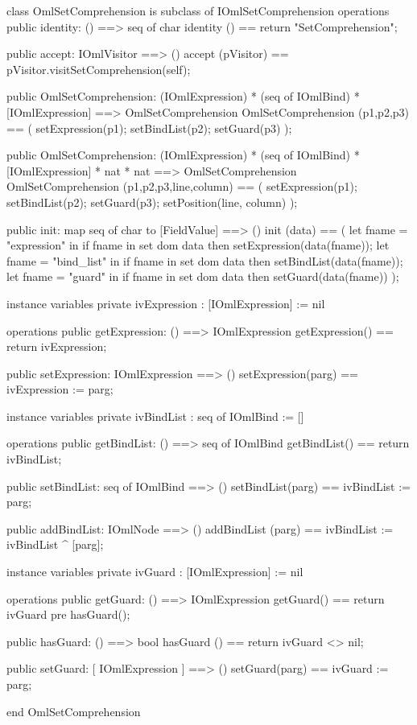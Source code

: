 \begin{vdm_al}
class OmlSetComprehension is subclass of IOmlSetComprehension
operations
  public identity: () ==> seq of char
  identity () == return "SetComprehension";

  public accept: IOmlVisitor ==> ()
  accept (pVisitor) == pVisitor.visitSetComprehension(self);

  public OmlSetComprehension:
    (IOmlExpression) *
    (seq of IOmlBind) *
    [IOmlExpression] ==> OmlSetComprehension
  OmlSetComprehension (p1,p2,p3) == 
    ( setExpression(p1);
      setBindList(p2);
      setGuard(p3) );

  public OmlSetComprehension:
    (IOmlExpression) *
    (seq of IOmlBind) *
    [IOmlExpression] *
    nat *
    nat ==> OmlSetComprehension
  OmlSetComprehension (p1,p2,p3,line,column) == 
    ( setExpression(p1);
      setBindList(p2);
      setGuard(p3);
      setPosition(line, column) );

  public init: map seq of char to [FieldValue] ==> ()
  init (data) ==
    ( let fname = "expression" in
        if fname in set dom data
        then setExpression(data(fname));
      let fname = "bind_list" in
        if fname in set dom data
        then setBindList(data(fname));
      let fname = "guard" in
        if fname in set dom data
        then setGuard(data(fname)) );

instance variables
  private ivExpression : [IOmlExpression] := nil

operations
  public getExpression: () ==> IOmlExpression
  getExpression() == return ivExpression;

  public setExpression: IOmlExpression ==> ()
  setExpression(parg) == ivExpression := parg;

instance variables
  private ivBindList : seq of IOmlBind := []

operations
  public getBindList: () ==> seq of IOmlBind
  getBindList() == return ivBindList;

  public setBindList: seq of IOmlBind ==> ()
  setBindList(parg) == ivBindList := parg;

  public addBindList: IOmlNode ==> ()
  addBindList (parg) == ivBindList := ivBindList ^ [parg];

instance variables
  private ivGuard : [IOmlExpression] := nil

operations
  public getGuard: () ==> IOmlExpression
  getGuard() == return ivGuard
    pre hasGuard();

  public hasGuard: () ==> bool
  hasGuard () == return ivGuard <> nil;

  public setGuard: [ IOmlExpression ] ==> ()
  setGuard(parg) == ivGuard := parg;

end OmlSetComprehension
\end{vdm_al}


